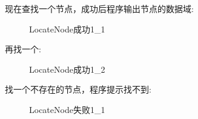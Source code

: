 \documentclass[supercite]{Experimental_Report}
\theoremstyle{definition}
\begin{document}
\clearpage
\noindent
现在查找一个节点，成功后程序输出节点的数据域:
\begin{figure}[H]
	\centering
	\centering
	\caption{LocateNode成功1\_1}
	\label{fig5-45}
\end{figure}

\noindent
再找一个:
\begin{figure}[H]
	\centering
	\centering
	\caption{LocateNode成功1\_2}
	\label{fig5-46}
\end{figure}


\clearpage
\noindent
找一个不存在的节点，程序提示找不到:
\begin{figure}[H]
	\centering
	\centering
	\caption{LocateNode失败1\_1}
	\label{fig5-47}
\end{figure}
\end{document}
